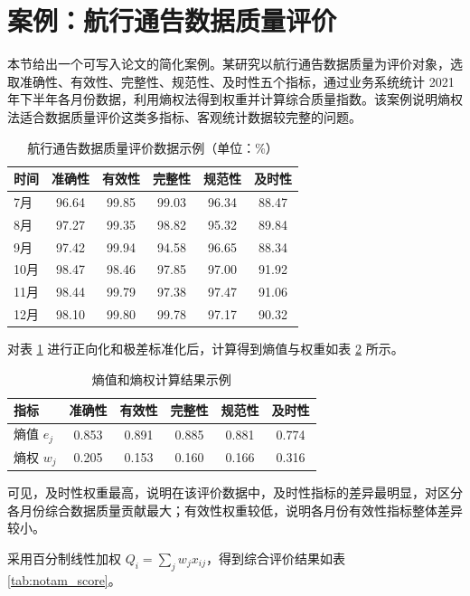 \documentclass[UTF8,a4paper,12pt]{ctexart}
\begin{document}
\section{案例：航行通告数据质量评价}

本节给出一个可写入论文的简化案例。某研究以航行通告数据质量为评价对象，选取准确性、有效性、完整性、规范性、及时性五个指标，通过业务系统统计 2021 年下半年各月份数据，利用熵权法得到权重并计算综合质量指数。该案例说明熵权法适合数据质量评价这类多指标、客观统计数据较完整的问题。

\begin{table}[H]
\centering
\caption{航行通告数据质量评价数据示例（单位：\%）}
\label{tab:notam_data}
\begin{tabular}{lccccc}
\toprule
时间 & 准确性 & 有效性 & 完整性 & 规范性 & 及时性\\
\midrule
7月 & 96.64 & 99.85 & 99.03 & 96.34 & 88.47\\
8月 & 97.27 & 99.35 & 98.82 & 95.32 & 89.84\\
9月 & 97.42 & 99.94 & 94.58 & 96.65 & 88.34\\
10月 & 98.47 & 98.46 & 97.85 & 97.00 & 91.92\\
11月 & 98.44 & 99.79 & 97.38 & 97.47 & 91.06\\
12月 & 98.10 & 99.80 & 99.78 & 97.17 & 90.32\\
\bottomrule
\end{tabular}
\end{table}

对表 \ref{tab:notam_data} 进行正向化和极差标准化后，计算得到熵值与权重如表 \ref{tab:notam_weight} 所示。

\begin{table}[H]
\centering
\caption{熵值和熵权计算结果示例}
\label{tab:notam_weight}
\begin{tabular}{lccccc}
\toprule
指标 & 准确性 & 有效性 & 完整性 & 规范性 & 及时性\\
\midrule
熵值 $e_j$ & 0.853 & 0.891 & 0.885 & 0.881 & 0.774\\
熵权 $w_j$ & 0.205 & 0.153 & 0.160 & 0.166 & 0.316\\
\bottomrule
\end{tabular}
\end{table}

可见，及时性权重最高，说明在该评价数据中，及时性指标的差异最明显，对区分各月份综合数据质量贡献最大；有效性权重较低，说明各月份有效性指标整体差异较小。

采用百分制线性加权 $Q_i=\sum_jw_jx_{ij}$，得到综合评价结果如表 \ref{tab:notam_score}。
\end{document}
